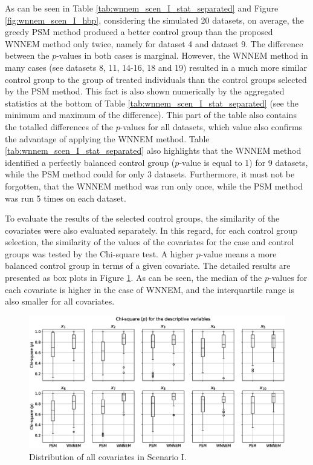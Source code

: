 		As can be seen in Table \ref{tab:wnnem_scen_I_stat_separated} and Figure \ref{fig:wnnem_scen_I_hbp}, considering the simulated 20 datasets, on average, the greedy PSM method produced a better control group than the proposed WNNEM method only twice, namely for dataset 4 and dataset 9. The difference between the $p$-values in both cases is marginal. However, the WNNEM method in many cases (see datasets 8, 11, 14-16, 18 and 19) resulted in a much more similar control group to the group of treated individuals than the control groups selected by the PSM method. This fact is also shown numerically by the aggregated statistics at the bottom of Table \ref{tab:wnnem_scen_I_stat_separated} (see the minimum and maximum of the difference). This part of the table also contains the totalled differences of the $p$-values for all datasets, which value also confirms the advantage of applying the WNNEM method. Table \ref{tab:wnnem_scen_I_stat_separated} also highlights that the WNNEM method identified a perfectly balanced control group ($p$-value is equal to 1) for 9 datasets, while the PSM method could for only 3 datasets. Furthermore, it must not be forgotten, that the WNNEM method was run only once, while the PSM method was run 5 times on each dataset. 
										
		To evaluate the results of the selected control groups, the similarity of the covariates were also evaluated separately. In this regard, for each control group selection, the similarity of the values of the covariates for the case and control groups was tested by the Chi-square test. A higher $p$-value means a more balanced control group in terms of a given covariate. The detailed results are presented as box plots in Figure \ref{fig:wnnem_scen_I_distribution}. As can be seen, the median of the $p$-values for each covariate is higher in the case of WNNEM, and the interquartile range is also smaller for all covariates.
										
		\begin{figure}[h]
			\centering
			\captionsetup{justification=centering}
			\includegraphics[width=\textwidth]{assets/figures/control_group_selection/wnnem/scenI/distribution.eps}
			\caption{Distribution of all covariates in Scenario I. %
			}
			\label{fig:wnnem_scen_I_distribution}    
		\end{figure}
		
